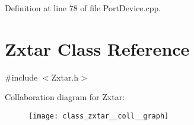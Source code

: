 \begin{appendices}
\-Definition at line 78 of file \-Port\-Device.\-cpp.


  
  
  
  
    \section{\-Zxtar \-Class \-Reference}
\label{class_zxtar}


{\ttfamily \#include $<$\-Zxtar.\-h$>$}



\-Collaboration diagram for \-Zxtar\-:\nopagebreak
\begin{figure}[H]
\begin{center}
\leavevmode
\texttt{[image: class\_zxtar\_\_coll\_\_graph]}
\end{center}
\end{figure}

\end{appendices}
